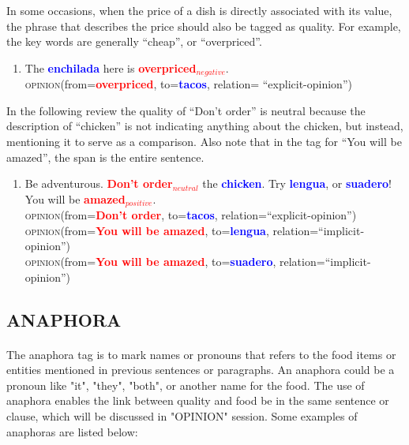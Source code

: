 \documentclass{article}
\begin{document}
In some occasions, when the price of a dish is directly associated with its value, the phrase that describes the price should also be tagged as quality. For example, the key words are generally ``cheap'', or  ``overpriced''. 

\begin{enumerate}[resume]
\item The \textbf{\textcolor{blue}{enchilada}} here is \textbf{\textcolor{red}{overpriced$_{negative}$}}.\\
\textsc{opinion}(from=\textbf{\textcolor{red}{overpriced}}, to=\textbf{\textcolor{blue}{tacos}}, relation= ``explicit-opinion'')\\
\end{enumerate}

In the following review the quality of ``Don't order'' is neutral because the description of ``chicken'' is not indicating anything about the chicken, but instead, mentioning it to serve as a comparison. Also note that in the tag for ``You will be amazed'', the span is the entire sentence. 

\begin{enumerate}[resume]
\item Be adventurous. \textbf{\textcolor{red}{Don't order$_{neutral}$}} the \textbf{\textcolor{blue}{chicken}}. Try \textbf{\textcolor{blue}{lengua}}, or \textbf{\textcolor{blue}{suadero}}! You will be \textbf{\textcolor{red}{amazed$_{positive}$}}.\\
	\textsc{opinion}(from=\textbf{\textcolor{red}{Don't order}}, to=\textbf{\textcolor{blue}{tacos}}, relation=``explicit-opinion'')\\
	\textsc{opinion}(from=\textbf{\textcolor{red}{You will be amazed}}, to=\textbf{\textcolor{blue}{lengua}}, relation=``implicit-opinion'')\\
	\textsc{opinion}(from=\textbf{\textcolor{red}{You will be amazed}}, to=\textbf{\textcolor{blue}{suadero}}, relation=``implicit-opinion'')
\end{enumerate}



\subsection{ANAPHORA}
\paragraph{}
The anaphora tag is to mark names or pronouns that refers to the food items or entities mentioned in previous sentences or paragraphs. An anaphora could be a pronoun like "it", "they", "both", or another name for the food. The use of anaphora enables the link between quality and food be in the same sentence or clause, which will be discussed in "OPINION" session. Some examples of anaphoras are listed below:
\end{document}

